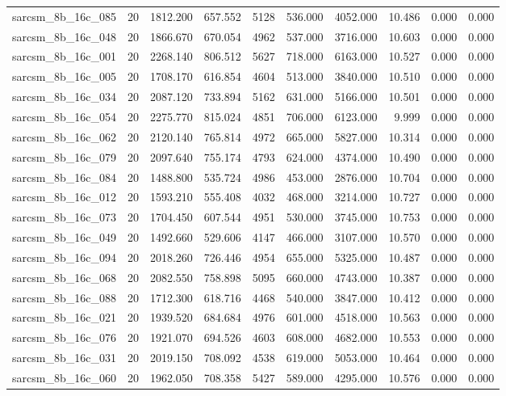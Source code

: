 \begin{tabular}{lrrrrrrrrr}
sarcsm\_8b\_16c\_085 & 20 & 1812.200 & 657.552 & 5128 & 536.000 & 4052.000 & 10.486 & 0.000 & 0.000 \\
sarcsm\_8b\_16c\_048 & 20 & 1866.670 & 670.054 & 4962 & 537.000 & 3716.000 & 10.603 & 0.000 & 0.000 \\
sarcsm\_8b\_16c\_001 & 20 & 2268.140 & 806.512 & 5627 & 718.000 & 6163.000 & 10.527 & 0.000 & 0.000 \\
sarcsm\_8b\_16c\_005 & 20 & 1708.170 & 616.854 & 4604 & 513.000 & 3840.000 & 10.510 & 0.000 & 0.000 \\
sarcsm\_8b\_16c\_034 & 20 & 2087.120 & 733.894 & 5162 & 631.000 & 5166.000 & 10.501 & 0.000 & 0.000 \\
sarcsm\_8b\_16c\_054 & 20 & 2275.770 & 815.024 & 4851 & 706.000 & 6123.000 & 9.999 & 0.000 & 0.000 \\
sarcsm\_8b\_16c\_062 & 20 & 2120.140 & 765.814 & 4972 & 665.000 & 5827.000 & 10.314 & 0.000 & 0.000 \\
sarcsm\_8b\_16c\_079 & 20 & 2097.640 & 755.174 & 4793 & 624.000 & 4374.000 & 10.490 & 0.000 & 0.000 \\
sarcsm\_8b\_16c\_084 & 20 & 1488.800 & 535.724 & 4986 & 453.000 & 2876.000 & 10.704 & 0.000 & 0.000 \\
sarcsm\_8b\_16c\_012 & 20 & 1593.210 & 555.408 & 4032 & 468.000 & 3214.000 & 10.727 & 0.000 & 0.000 \\
sarcsm\_8b\_16c\_073 & 20 & 1704.450 & 607.544 & 4951 & 530.000 & 3745.000 & 10.753 & 0.000 & 0.000 \\
sarcsm\_8b\_16c\_049 & 20 & 1492.660 & 529.606 & 4147 & 466.000 & 3107.000 & 10.570 & 0.000 & 0.000 \\
sarcsm\_8b\_16c\_094 & 20 & 2018.260 & 726.446 & 4954 & 655.000 & 5325.000 & 10.487 & 0.000 & 0.000 \\
sarcsm\_8b\_16c\_068 & 20 & 2082.550 & 758.898 & 5095 & 660.000 & 4743.000 & 10.387 & 0.000 & 0.000 \\
sarcsm\_8b\_16c\_088 & 20 & 1712.300 & 618.716 & 4468 & 540.000 & 3847.000 & 10.412 & 0.000 & 0.000 \\
sarcsm\_8b\_16c\_021 & 20 & 1939.520 & 684.684 & 4976 & 601.000 & 4518.000 & 10.563 & 0.000 & 0.000 \\
sarcsm\_8b\_16c\_076 & 20 & 1921.070 & 694.526 & 4603 & 608.000 & 4682.000 & 10.553 & 0.000 & 0.000 \\
sarcsm\_8b\_16c\_031 & 20 & 2019.150 & 708.092 & 4538 & 619.000 & 5053.000 & 10.464 & 0.000 & 0.000 \\
sarcsm\_8b\_16c\_060 & 20 & 1962.050 & 708.358 & 5427 & 589.000 & 4295.000 & 10.576 & 0.000 & 0.000 \\

\end{tabular}
